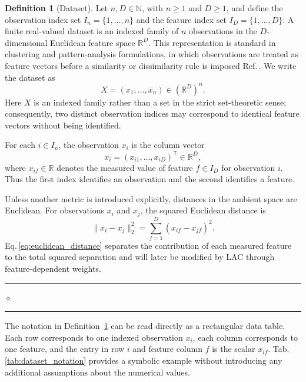 \documentclass[11pt,a4paper]{article}
\newcommand{\R}{\mathbb{R}}
\theoremstyle{definition}
\newtheorem{definition}{Definition}[section]
\theoremstyle{plain}
\newcommand{\definitionseparator}{%
    \par\nobreak\vspace{0.15em}%
    \noindent\hfill
    \rule{0.19\linewidth}{0.30pt}%
    \hspace{0.65em}%
    {\scriptsize$\diamond$}%
    \hspace{0.65em}%
    \rule{0.19\linewidth}{0.30pt}%
    \hfill\mbox{}%
    \par\vspace{0.35em}%
}
\begin{document}
\begin{definition}[Dataset]
\label{def:dataset}
Let $n,D\in\mathbb{N}$, with $n\ge1$ and $D\ge1$, and define the observation index set $I_n=\{1,\ldots,n\}$ and the feature index set $I_D=\{1,\ldots,D\}$. A finite real-valued dataset is an indexed family of $n$ observations in the $D$-dimensional Euclidean feature space $\R^D$. This representation is standard in clustering and pattern-analysis formulations, in which observations are treated as feature vectors before a similarity or dissimilarity rule is imposed Ref.\,\cite{jain1999review}. We write the dataset as
\begin{equation}
    X=(x_1,\ldots,x_n)\in(\R^D)^n.
    \label{eq:dataset}
\end{equation}
Here $X$ is an indexed family rather than a set in the strict set-theoretic sense; consequently, two distinct observation indices may correspond to identical feature vectors without being identified.

For each $i\in I_n$, the observation $x_i$ is the column vector
\begin{equation}
    x_i=(x_{i1},\ldots,x_{iD})^{\mathsf T}\in\R^D,
    \label{eq:observation_vector}
\end{equation}
where $x_{if}\in\R$ denotes the measured value of feature $f\in I_D$ for observation $i$. Thus the first index identifies an observation and the second identifies a feature.

Unless another metric is introduced explicitly, distances in the ambient space are Euclidean. For observations $x_i$ and $x_j$, the squared Euclidean distance is
\begin{equation}
    \|x_i-x_j\|_2^2
    =\sum_{f=1}^{D}(x_{if}-x_{jf})^2.
    \label{eq:euclidean_distance}
\end{equation}
Eq.\,\eqref{eq:euclidean_distance} separates the contribution of each measured feature to the total squared separation and will later be modified by LAC through feature-dependent weights.
\end{definition}
\definitionseparator

The notation in Definition~\ref{def:dataset} can be read directly as a rectangular data table. Each row corresponds to one indexed observation $x_i$, each column corresponds to one feature, and the entry in row $i$ and feature column $f$ is the scalar $x_{if}$. Tab.\,\ref{tab:dataset_notation} provides a symbolic example without introducing any additional assumptions about the numerical values.
\end{document}
